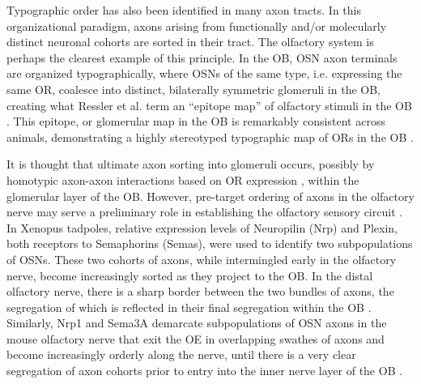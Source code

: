 \label{sec:Typography}
Typographic order has also been identified in many axon tracts.
In this organizational paradigm, axons arising from functionally and/or molecularly distinct neuronal cohorts are sorted in their tract.
The olfactory system is perhaps the clearest example of this principle. 
In the OB, OSN axon terminals are organized typographically, where OSNs of the same type, i.e. expressing the same OR, coalesce into distinct, bilaterally symmetric glomeruli in the OB, creating what Ressler et al. term an “epitope map” of olfactory stimuli in the OB \cite{ressler1994information,vassar1994topographic}.
This epitope, or glomerular map in the OB is remarkably consistent across animals, demonstrating a highly stereotyped typographic map of ORs in the OB \cite{ressler1994information,vassar1994topographic}.

It is thought that ultimate axon sorting into glomeruli occurs, possibly by homotypic axon-axon interactions based on OR expression \cite{feinstein2004contextual}, within the glomerular layer of the OB.
However, pre-target ordering of axons in the olfactory nerve may serve a preliminary role in establishing the olfactory sensory circuit \cite{miller2010axon}.
In Xenopus tadpoles, relative expression levels of Neuropilin (Nrp) and Plexin, both receptors to Semaphorins (Semas), were used to identify two subpopulations of OSNs.
These two cohorts of axons, while intermingled early in the olfactory nerve, become increasingly sorted as they project to the OB.
In the distal olfactory nerve, there is a sharp border between the two bundles of axons, the segregation of which is reflected in their final segregation within the OB \cite{satoda1995differential}.
Similarly, Nrp1 and Sema3A demarcate subpopulations of OSN axons in the mouse olfactory nerve that exit the OE in overlapping swathes of axons and become increasingly orderly along the nerve, until there is a very clear segregation of axon cohorts prior to entry into the inner nerve layer of the OB \cite{imai2009pre,miller2010axon}.

